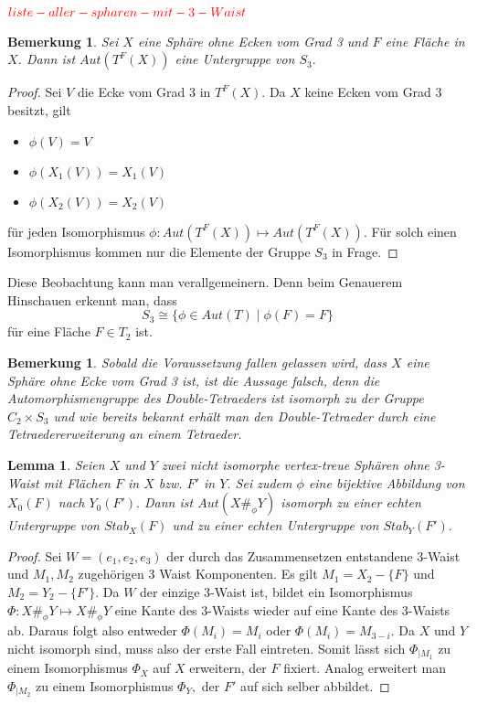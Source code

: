 \documentclass[12pt,titlepage,twoside,cleardoublepage]{article}
\theoremstyle{nummermitklammern}
\newtheorem{lemma}[temp]{Lemma}
\newtheorem{bemerkung}[temp]{Bemerkung}
\newtheorem{lemma}[zahl]{Lemma}
\newtheorem{bemerkung}[zahl]{Bemerkung}
\numberwithin{equation}{section}
\begin{document}
$\textcolor{red}{liste-aller-spharen-mit-3-Waist}$
\begin{bemerkung}
Sei $X$ eine Sphäre ohne Ecken vom Grad 3 und $F$ eine Fläche in $X$. Dann ist $Aut(T^F(X))$ eine Untergruppe von $S_3.$ 
\end{bemerkung}
\begin{proof}
Sei $V$ die Ecke vom Grad 3 in $T^F(X).$
Da $X$ keine Ecken vom Grad 3 besitzt, gilt
\begin{itemize}
\item $\phi(V)=V$
\item $\phi (X_1(V))=X_1(V)$
\item $\phi (X_2(V))=X_2(V)$
\end{itemize}
für jeden Isomorphismus $\phi:Aut({T}^F(X))\mapsto Aut({T}^F(X)).$ Für solch einen Isomorphismus kommen nur die Elemente der Gruppe $S_3$ in Frage. 
\end{proof}
Diese Beobachtung kann man verallgemeinern. Denn beim Genauerem Hinschauen erkennt man, dass 
\[
S_3\cong\{\phi\in Aut(T)\mid \phi(F)=F\}
\] für eine Fläche $F\in T_2$ ist.
\begin{bemerkung}
Sobald die Voraussetzung fallen gelassen wird, dass $X$ eine Sphäre ohne Ecke vom Grad 3 ist, ist die Aussage falsch, denn die Automorphismengruppe des Double-Tetraeders ist isomorph zu der Gruppe $C_2\times S_3$ und wie bereits bekannt erhält man den Double-Tetraeder durch eine Tetraedererweiterung an einem Tetraeder.
\end{bemerkung}
\begin{lemma}
Seien $X$ und $Y$ zwei nicht isomorphe vertex-treue Sphären ohne 3-Waist mit Flächen $F$ in $X$ bzw. $F'$ in $Y$. Sei zudem $\phi$ eine bijektive Abbildung von $X_0(F)$ nach $Y_0(F').$ Dann ist $Aut(X\#_\phi Y)$ isomorph zu einer echten Untergruppe von $Stab_X(F)$ und zu einer echten Untergruppe von $Stab_Y(F').$
\end{lemma}
\begin{proof}
Sei $W=(e_1,e_2,e_3)$ der durch das Zusammensetzen entstandene 3-Waist und $M_1,M_2$ zugehörigen 3 Waist Komponenten. Es gilt $M_1=X_2-\{F\}$ und $M_2=Y_2-\{F'\}.$ Da $W$ der einzige 3-Waist ist, bildet ein Isomorphismus $\Phi:X\#_{\phi}Y \mapsto X\#_{\phi}Y$  eine Kante des 3-Waists wieder auf eine Kante des 3-Waists ab. Daraus folgt also entweder $\Phi(M_i)=M_i$ oder $\Phi(M_i)=M_{3-i}.$ Da $X$ und $Y$ nicht isomorph sind, muss also der erste Fall eintreten. Somit lässt sich \textsc{$\Phi_{\mid M_1}$} zu einem Isomorphismus $\Phi_X$ auf $X$ erweitern, der $F$ fixiert. Analog erweitert man $\Phi_{\mid M_2}$ zu einem Isomorphismus $\Phi_Y,$ der $F'$ auf sich selber abbildet.
\end{proof}
\end{document}
